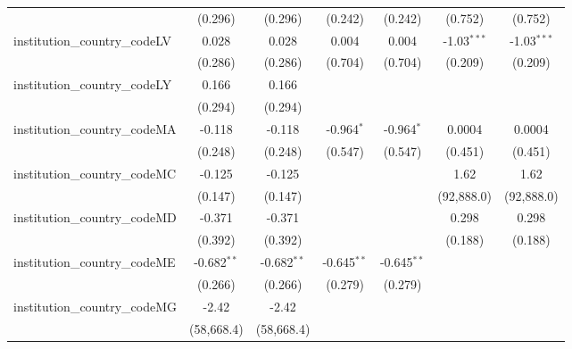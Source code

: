 \begin{tabular}{lcccccc}
                                         & (0.296)        & (0.296)        & (0.242)        & (0.242)        & (0.752)        & (0.752)\\   
   institution\_country\_codeLV          & 0.028          & 0.028          & 0.004          & 0.004          & -1.03$^{***}$  & -1.03$^{***}$\\   
                                         & (0.286)        & (0.286)        & (0.704)        & (0.704)        & (0.209)        & (0.209)\\   
   institution\_country\_codeLY          & 0.166          & 0.166          &                &                &                &   \\   
                                         & (0.294)        & (0.294)        &                &                &                &   \\   
   institution\_country\_codeMA          & -0.118         & -0.118         & -0.964$^{*}$   & -0.964$^{*}$   & 0.0004         & 0.0004\\   
                                         & (0.248)        & (0.248)        & (0.547)        & (0.547)        & (0.451)        & (0.451)\\   
   institution\_country\_codeMC          & -0.125         & -0.125         &                &                & 1.62           & 1.62\\   
                                         & (0.147)        & (0.147)        &                &                & (92,888.0)     & (92,888.0)\\   
   institution\_country\_codeMD          & -0.371         & -0.371         &                &                & 0.298          & 0.298\\   
                                         & (0.392)        & (0.392)        &                &                & (0.188)        & (0.188)\\   
   institution\_country\_codeME          & -0.682$^{**}$  & -0.682$^{**}$  & -0.645$^{**}$  & -0.645$^{**}$  &                &   \\   
                                         & (0.266)        & (0.266)        & (0.279)        & (0.279)        &                &   \\   
   institution\_country\_codeMG          & -2.42          & -2.42          &                &                &                &   \\   
                                         & (58,668.4)     & (58,668.4)     &                &                &                &   \\   

\end{tabular}
